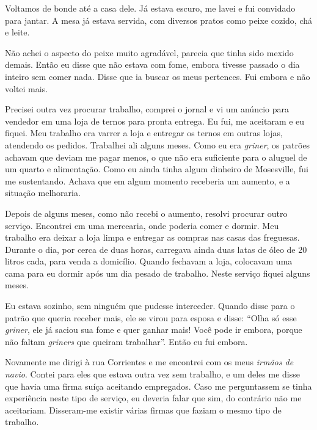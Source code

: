 Voltamos de bonde até a casa dele. Já estava escuro, me lavei e fui
convidado para jantar. A mesa já estava servida, com diversos
pratos como peixe cozido, chá e leite.

Não achei o aspecto do peixe muito agradável, parecia que tinha sido 
mexido demais. Então eu disse que não estava com fome, embora tivesse
passado o dia inteiro sem comer nada. Disse que ia buscar os meus
pertences. Fui embora e não voltei mais.

Precisei outra vez procurar trabalho, comprei o jornal e vi um anúncio para vendedor em uma loja de ternos para pronta entrega. Eu fui, me aceitaram e eu fiquei. Meu trabalho era varrer a loja e
entregar os ternos em outras lojas, atendendo os pedidos.
Trabalhei ali alguns meses. Como eu era \textit{griner}, os patrões achavam
que deviam me pagar menos, o que não era suficiente para o aluguel
de um quarto e alimentação. Como eu ainda tinha algum dinheiro de
Mosesville, fui me sustentando. Achava que em algum momento receberia um aumento, e
a situação melhoraria.

Depois de alguns meses, como não recebi o aumento, resolvi procurar
outro serviço. Encontrei em uma mercearia, onde poderia comer e dormir. Meu trabalho era deixar a loja limpa e entregar as compras nas
casas das freguesas. Durante o dia, por cerca de duas horas, carregava ainda duas
latas de óleo de 20 litros cada, para venda a domicílio. Quando
fechavam a loja, colocavam uma cama para eu dormir após um dia pesado
de trabalho. Neste serviço fiquei alguns meses. 


Eu estava sozinho, sem ninguém que pudesse interceder. Quando disse
para o patrão que queria receber mais, ele se virou para esposa e
disse: ``Olha só esse \textit{griner}, ele já saciou sua fome e quer
ganhar mais! Você pode ir embora, porque não faltam \textit{griners} que
queiram trabalhar''. Então eu fui embora.

Novamente me dirigi à rua Corrientes e me encontrei com os meus \textit{irmãos
de navio}. Contei para eles que estava outra vez sem trabalho, e um
deles me disse que havia uma firma suíça aceitando empregados. 
Caso me perguntassem se tinha experiência neste
tipo de serviço, eu deveria falar que sim, do contrário não me
aceitariam. Disseram-me existir várias firmas que faziam o mesmo
tipo de trabalho.

